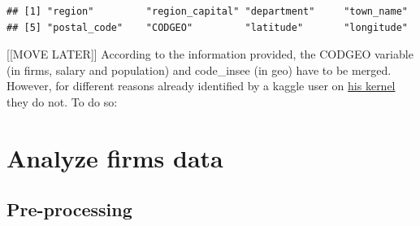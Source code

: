 \documentclass[]{article}
\newenvironment{Shaded}{\begin{snugshade}}{\end{snugshade}}
\newcommand{\KeywordTok}[1]{\textcolor[rgb]{0.13,0.29,0.53}{\textbf{#1}}}
\newcommand{\StringTok}[1]{\textcolor[rgb]{0.31,0.60,0.02}{#1}}
\newcommand{\OperatorTok}[1]{\textcolor[rgb]{0.81,0.36,0.00}{\textbf{#1}}}
\newcommand{\NormalTok}[1]{#1}
\begin{document}
\begin{verbatim}
## [1] "region"         "region_capital" "department"     "town_name"     
## [5] "postal_code"    "CODGEO"         "latitude"       "longitude"
\end{verbatim}

{[}{[}MOVE LATER{]}{]} According to the information provided, the CODGEO
variable (in firms, salary and population) and code\_insee (in geo) have
to be merged. However, for different reasons already identified by a
kaggle user on
\href{https://www.kaggle.com/anqitu/insights-on-business-demographic-inequality}{his
kernel} they do not. To do so:

\begin{Shaded}
\end{Shaded}

\section{Analyze firms data}\label{analyze-firms-data}

\subsection{Pre-processing}\label{pre-processing}
\end{document}
